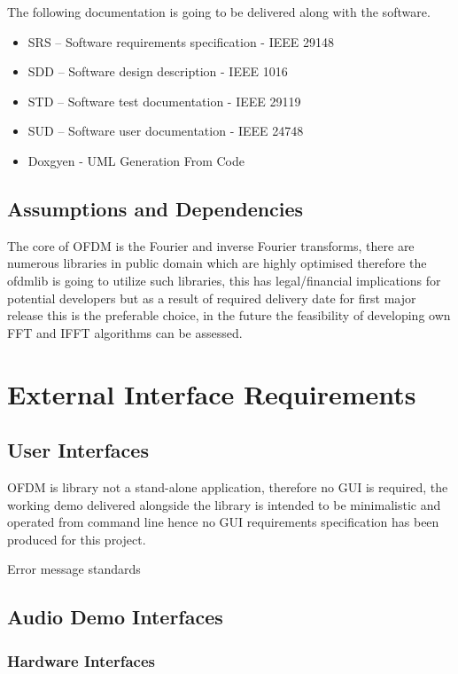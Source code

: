 \documentclass[]{report}
\begin{document}
The following documentation is going to be delivered along with the software.

\begin{itemize}
	\item SRS – Software requirements specification - IEEE 29148
	\item SDD – Software design description - IEEE 1016
	\item STD – Software test documentation - IEEE 29119
	\item SUD – Software user documentation - IEEE 24748
	\item Doxgyen - UML Generation From Code 
\end{itemize}



\subsection{Assumptions and Dependencies}

The core of OFDM is the Fourier and inverse Fourier transforms, there are numerous libraries in public domain which are highly optimised therefore the ofdmlib is going to utilize such libraries, this has legal/financial implications for potential developers but as a result of required delivery date for first major release this is the preferable choice, in the future the feasibility of developing own FFT and IFFT algorithms can be assessed.

\pagebreak
\section{External Interface Requirements}

\subsection{User Interfaces}

OFDM is library not a stand-alone application, therefore no GUI is required, the working demo delivered alongside the library is intended to be minimalistic and operated from command line hence no GUI requirements specification has been produced for this project. 

Error message standards

\subsection{Audio Demo Interfaces}


\subsubsection{Hardware Interfaces}
\end{document}
